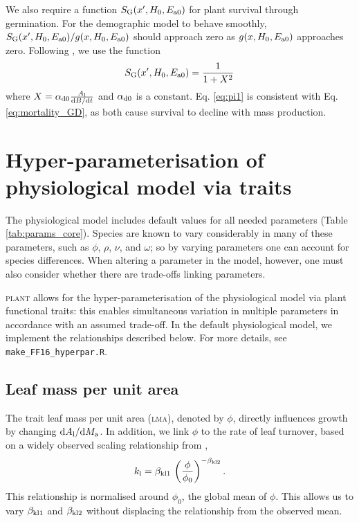 \documentclass[10pt,twoside]{article}
\newcommand{\plant}{\textsc{plant}}
\begin{document}
We also require a function \(S_{\rm G}  (x^\prime, H_0, E_{{\rm a}0})\) for plant survival
through germination. For the demographic model to behave smoothly,
\(S_{\rm G}  (x^\prime, H_0, E_{{\rm a}0}) / g(x, H_0, E_{{\rm a}0})\) should approach zero as
\(g(x, H_0, E_{{\rm a}0})\) approaches zero. Following \citet{Falster-2011},
we use the function
\begin{equation} \label{eq:pi1}
S_{\rm G} (x^\prime, H_0, E_{{\rm a}0}) = \frac1{1 + X^2}
\end{equation}
where $X = \alpha_{{\rm d0}} \frac{A_{\rm l}}{{\rm d}B / {\rm d}t}$ and $\alpha_{{\rm d0}}$ is a
constant. Eq. \ref{eq:pi1} is consistent with Eq.
\ref{eq:mortality_GD}, as both cause survival to decline with mass production.

\section{Hyper-parameterisation of physiological model via
traits}\label{traits}

The physiological model includes default values for all needed parameters
(Table \ref{tab:params_core}). Species are known to vary considerably
in many of these parameters, such as $\phi$, $\rho$, $\nu$, and $\omega$; so by varying parameters
one can account for species differences. When altering a parameter in the model, however,
one must also consider whether there are trade-offs linking parameters.

{\plant} allows for the
hyper-parameterisation of the physiological model via plant functional traits: this enables
simultaneous variation in multiple parameters in accordance with an assumed trade-off. In the
default physiological model, we implement the relationships described below. For more
details, see \texttt{make\_FF16\_hyperpar.R}.

\subsection{Leaf mass per unit area}

The trait leaf mass per unit area (\textsc{lma}), denoted by $\phi$, directly influences growth by changing
${\rm d}A_{\rm l} / {\rm d}M_{\rm a}$. In addition, we
link $\phi$ to the rate of leaf turnover,
based on a widely observed scaling relationship from \citet{Wright-2004},
$$k_{\rm l} = \beta_{{\rm kl1}} \, \left(\frac{\phi}{\phi_0}\right)^{-\beta_{{\rm kl2}}}.$$
This relationship is normalised around $\phi_0$, the global mean of $\phi$. This
allows us to vary $\beta_{{\rm kl1}}$ and $\beta_{{\rm kl2}}$ without displacing the relationship from the
observed mean.
\end{document}

